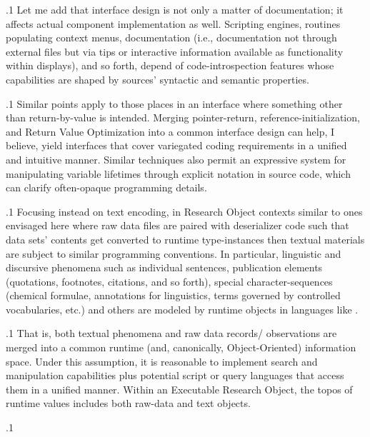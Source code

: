 \documentclass[11pt, twocolumn]{article}
\begin{document}
\p.1{%
Let me add that interface design
is not only a matter of documentation; it
affects actual component implementation
as well. Scripting engines, routines
populating context menus,
 documentation
(i.e., documentation not through external files
but via tips or interactive information
available as functionality within
 displays), and so forth, depend
of code-introspection features whose
capabilities are shaped by sources'
syntactic and semantic properties.\newpage{}
}%

\p.1{%
Similar points apply to those places in an interface
where something other than return-by-value is
intended. Merging pointer-return, reference-initialization,
and Return Value Optimization into a common
interface design can help, I believe,
yield interfaces that cover variegated
coding requirements in a unified and
intuitive manner. Similar techniques also
permit an expressive system for manipulating
variable lifetimes through explicit
notation in source code, which can
clarify often-opaque programming details.
}%

\p.1{%
Focusing instead on text encoding, in
Research Object contexts similar
to ones envisaged here \mdash{} where raw
data files are paired with deserializer
code such that data sets' contents get
converted to runtime type-instances \mdash{}
then textual materials are subject
to similar programming conventions.
In particular, linguistic and discursive
phenomena such as individual sentences,
publication elements (quotations, footnotes,
citations, and so forth), special character-sequences
(chemical formulae, annotations for linguistics,
terms governed by controlled vocabularies, etc.)
and others are modeled by runtime objects
in languages like .
}%

\p.1{%
That is, both textual phenomena and raw data
records/ observations are merged into a
common runtime (and, canonically,
Object-Oriented) information space.
Under this assumption, it is reasonable
to implement search and manipulation
capabilities \mdash{} plus potential
script or query languages that access
them \mdash{} in a unified manner. Within
an Executable Research Object,
the topos of runtime values
includes both raw-data and text objects.
}%

\pa.1{%

}%
\end{document}
